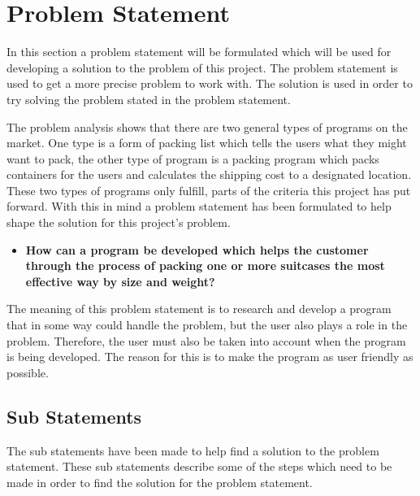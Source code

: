 \section{Problem Statement}
\label{sec:thesis}
In this section a problem statement will be formulated which will be used for developing a solution to the problem of this project. The problem statement is used to get a more precise problem to work with. The solution is used in order to try solving the problem stated in the problem statement.

The problem analysis shows that there are two general types of programs on the market. One type is a form of packing list which tells the users what they might want to pack, the other type of program is a packing program which packs containers for the users and calculates the shipping cost to a designated location. These two types of programs only fulfill, parts of the criteria this project has put forward. With this in mind a problem statement has been formulated to help shape the solution for this project's problem.

\begin{itemize}
\item \textbf{How can a program be developed which helps the customer through the process of packing one or more suitcases the most effective way by size and weight?}
\end{itemize}

The meaning of this problem statement is to research and develop a program that in some way could handle the problem, but the user also plays a role in the problem.
Therefore, the user must also be taken into account when the program is being developed. The reason for this is to make the program as user friendly as possible.

\subsection{Sub Statements}
The sub statements have been made to help find a solution to the problem statement. These sub statements describe some of the steps which need to be made in order to find the solution for the problem statement.

